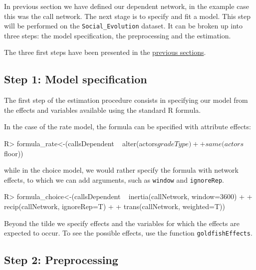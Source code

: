 \documentclass[article]{jss}
\begin{document}
In previous section we have defined our dependent network, in the example case this was the call network. The next stage is to specify and fit a model. This step will be performed on the \texttt{Social\_Evolution} dataset. It can be broken up into three steps: the model specification, the preprocessing and the estimation.


The three first steps have been presented in the \hyperref[subsubsec:dep_networks]{previous sections}.
%



\subsection[Model specification]{Step 1: Model specification} \label{subsec:model_specification}

The first step of the estimation procedure consists in specifying our model from the effects and variables available using the standard R formula.

In the case of the rate model, the formula can be specified with attribute effects:
\begin{Schunk}
\begin{Sinput}
R> formula_rate<-(callsDependent ~ alter(actors$gradeType) 
+                 + same(actors$floor))
\end{Sinput}
\end{Schunk}

while in the choice model, we would rather specify the formula with network effects, to which we can add arguments, such as \texttt{window} and \texttt{ignoreRep}.
\begin{Schunk}
\begin{Sinput}
R> formula_choice<-(callsDependent ~ inertia(callNetwork, window=3600) 
+                   + recip(callNetwork, ignoreRep=T) 
+                   + trans(callNetwork, weighted=T))
\end{Sinput}
\end{Schunk}

Beyond the tilde we specify effects and the variables for which the effects are expected to occur. To see the possible effects, use the function \texttt{goldfishEffects}.



\subsection[Step 2: Preprocessing]{Step 2: Preprocessing} \label{subsec:preprocess}
\end{document}
